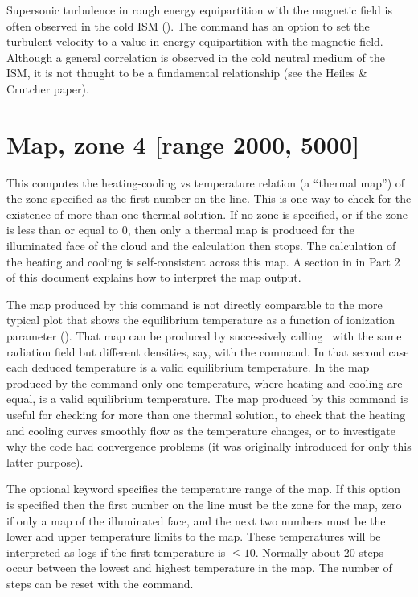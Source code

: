 Supersonic turbulence in rough energy equipartition with the magnetic
field is often observed in the cold ISM (\citealp{HeilesCrutcher2005}).
The
 command has an
 option
to set the turbulent velocity to a value in energy equipartition
with the magnetic field.
Although a general correlation is observed in the cold
neutral medium of the ISM, it is not thought to be a fundamental relationship (see the Heiles \& Crutcher paper).

\section{Map, zone 4 [range 2000, 5000]}

This computes the heating-cooling vs temperature relation (a ``thermal
map'') of the zone specified as the first number on the line.
This is one
way to check for the existence of more than one thermal solution.
If no
zone is specified, or if the zone is less than or equal to 0, then only
a thermal map is produced for the illuminated face of the cloud and the
calculation then stops.
The calculation of the heating and cooling is
self-consistent across this map.
A section in  in Part 2 of this
document explains how to interpret the map output.

The map produced by this command is not directly comparable to the more
typical plot that shows the equilibrium temperature as a function of
ionization parameter (\citealp{Krolik1981}).
That map can be
produced by successively calling \Cloudy\ with the same
radiation field
but different densities, say, with the  command.
In that second case each deduced temperature is a valid
equilibrium temperature.
In the map produced by the  command only one
temperature, where heating and cooling are equal, is a valid equilibrium
temperature.
The map produced by this command is useful for checking for
more than one thermal solution,
to check that the heating and cooling curves
smoothly flow as the temperature changes,
or to investigate why the code
had convergence problems
(it was originally introduced for only this latter purpose).

The optional keyword  specifies the temperature
range of the map.
If this option is specified then the first number on the line must be the
zone for the map, zero if only a map of the illuminated face,
and the next two
numbers must be the lower and upper temperature limits to the map.
These temperatures
will be interpreted as logs if the first temperature is $\le 10$.  Normally
about 20 steps occur between the lowest and highest temperature in the map.
The number of steps can be reset with the  command.

